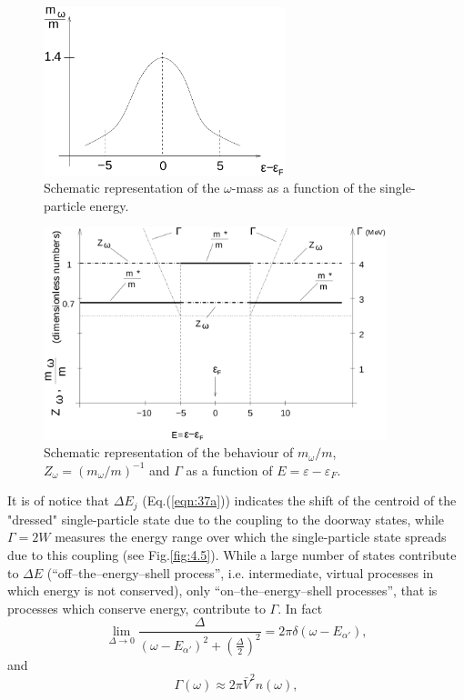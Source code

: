 \begin{figure}[h!]
\centerline {
\includegraphics*[width=7cm]{introduccion/figs/figintroD3}
}
\caption{Schematic representation of the $\omega$-mass as a function of the single-particle energy.}
\label{fig:4.3}
\end{figure}

\begin{figure}[h!]
\centerline {
\includegraphics*[width=10cm]{introduccion/figs/figintroD4}
}
\caption{Schematic representation of the behaviour of $m_{\omega}/m$, $Z_{\omega}=(m_{\omega}/m)^{-1}$ and $\Gamma$ as a function of $E = \varepsilon - \varepsilon_F$.}
\label{fig:4.4}
\end{figure}


It is of notice that $\Delta E_j$ (Eq.(\ref{eqn:37a})) indicates the shift  of the  centroid of the "dressed" single-particle state due to the coupling to the  doorway states, while $\Gamma = 2W$ measures the energy range over which the single-particle state spreads due to this coupling (see Fig.\ref{fig:4.5}). While a large number of states contribute to $\Delta E$ (``off--the--energy--shell process'', i.e. intermediate, virtual processes in which energy is not conserved), only ``on--the--energy--shell processes'', that is processes which conserve  energy, contribute to $\Gamma$. In fact
\begin{equation}
\nonumber
\lim_{\Delta \rightarrow 0} \frac{\Delta}{(\omega -E_{\alpha'})^2 + \left( \frac{\Delta}{2} \right)^2} = 2\pi\delta(\omega-E_{\alpha'}) ,
\end{equation}
and
\begin{equation}
\Gamma(\omega) \approx 2\pi \bar{V}^2 n(\omega) ,
\label{eqn:41}
\end{equation}

